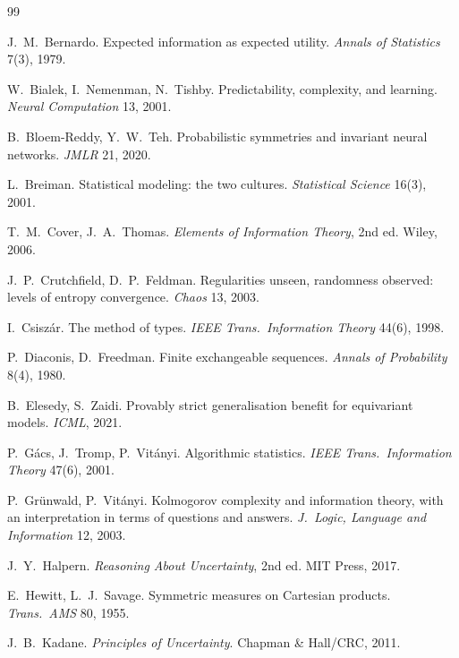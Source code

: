 \documentclass[11pt]{article}
\theoremstyle{definition}
\theoremstyle{plain}
\theoremstyle{remark}
\begin{document}
\begin{thebibliography}{99}

 J.~M.~Bernardo. Expected information as expected
utility. \emph{Annals of Statistics} 7(3), 1979.

 W.~Bialek, I.~Nemenman, N.~Tishby. Predictability,
complexity, and learning. \emph{Neural Computation} 13, 2001.

 B.~Bloem-Reddy, Y.~W.~Teh. Probabilistic
symmetries and invariant neural networks. \emph{JMLR} 21, 2020.

 L.~Breiman. Statistical modeling: the two cultures.
\emph{Statistical Science} 16(3), 2001.

 T.~M.~Cover, J.~A.~Thomas. \emph{Elements of
Information Theory}, 2nd ed. Wiley, 2006.

 J.~P.~Crutchfield, D.~P.~Feldman. Regularities
unseen, randomness observed: levels of entropy convergence.
\emph{Chaos} 13, 2003.

 I.~Csisz\'ar. The method of types. \emph{IEEE
Trans.\ Information Theory} 44(6), 1998.

 P.~Diaconis, D.~Freedman. Finite
exchangeable sequences. \emph{Annals of Probability} 8(4), 1980.

 B.~Elesedy, S.~Zaidi. Provably strict
generalisation benefit for equivariant models. \emph{ICML}, 2021.

 P.~G\'acs, J.~Tromp, P.~Vit\'anyi. Algorithmic
statistics. \emph{IEEE Trans.\ Information Theory} 47(6), 2001.

 P.~Gr\"unwald, P.~Vit\'anyi. Kolmogorov complexity
and information theory, with an interpretation in terms of questions
and answers. \emph{J.\ Logic, Language and Information} 12, 2003.

 J.~Y.~Halpern. \emph{Reasoning About Uncertainty},
2nd ed. MIT Press, 2017.

 E.~Hewitt, L.~J.~Savage. Symmetric measures on
Cartesian products. \emph{Trans.\ AMS} 80, 1955.

 J.~B.~Kadane. \emph{Principles of Uncertainty}.
Chapman \& Hall/CRC, 2011.


\end{thebibliography}
\end{document}
